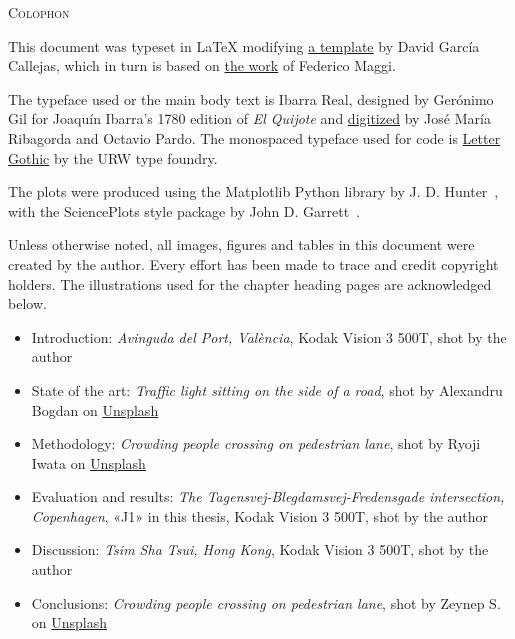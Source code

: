 
\thispagestyle{empty}

\vspace*{\fill}

\noindent\textsc{Colophon}

\medskip

\noindent This document was typeset in \LaTeX{} modifying \href{https://github.com/garciacallejas/Thesis}{a template} by David García Callejas, which in turn is based on \href{https://github.com/phretor/cs-phd-dissertation-latex-template}{the work} of Federico Maggi.

The typeface used or the main body text is Ibarra Real, designed by Gerónimo Gil for Joaquín Ibarra's 1780 edition of \textit{El Quijote} and \href{https://github.com/googlefonts/ibarrareal/tree/main}{digitized} by José María Ribagorda and Octavio Pardo. The monospaced typeface used for code is \href{https://www.ctan.org/tex-archive/fonts/urw/lettergothic/}{Letter Gothic} by the URW type foundry.

The plots were produced using the Matplotlib Python library by J. D. Hunter~\cite{Hunter2007}, with the SciencePlots style package by John D. Garrett~\cite{SciencePlots}.

\medskip

\noindent Unless otherwise noted, all images, figures and tables in this document were created by the author. Every effort has been made to trace and credit copyright holders. The illustrations used for the chapter heading pages are acknowledged below.

\begin{itemize}
\item Introduction: \textit{Avinguda del Port, València}, Kodak Vision 3 500T, shot by the author
\item State of the art: \textit{Traffic light sitting on the side of a road}, shot by Alexandru Bogdan on \href{https://unsplash.com/photos/a-traffic-light-sitting-on-the-side-of-a-road-Q80ob8zJhZY}{Unsplash}
\item Methodology: \textit{Crowding people crossing on pedestrian lane}, shot by Ryoji Iwata on \href{https://unsplash.com/photos/crowding-people-crossing-on-pedestrian-lane-CLZ5DzbbhG0}{Unsplash}
\item Evaluation and results: \textit{The Tagensvej-Blegdamsvej-Fredensgade intersection, Copenhagen}, «J1» in this thesis, Kodak Vision 3 500T, shot by the author
\item Discussion: \textit{Tsim Sha Tsui, Hong Kong}, Kodak Vision 3 500T, shot by the author
\item Conclusions: \textit{Crowding people crossing on pedestrian lane}, shot by Zeynep S. on \href{https://unsplash.com/photos/people-walking-on-street-near-brown-concrete-building-during-daytime-au1DIRkLwMo}{Unsplash}
\end{itemize}

\medskip

\clearpage
